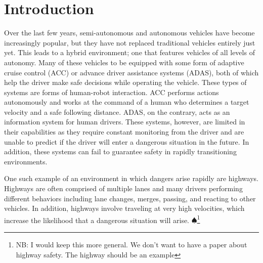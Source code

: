 \documentclass[conference]{IEEEtran}
\newcommand\NB[1]{$\spadesuit$\footnote{NB: #1}}
\begin{document}
\begin{abstract}
\end{abstract}





%
\IEEEpeerreviewmaketitle



\section{Introduction}
    Over the last few years, semi-autonomous and autonomous vehicles have become increasingly popular, but they have not replaced traditional vehicles entirely just yet. This leads to a hybrid environment; one that features vehicles of all levels of autonomy. Many of these vehicles to be equipped with some form of adaptive cruise control (ACC) or advance driver assistance systems (ADAS), both of which help the driver make safe decisions while operating the vehicle. These types of systems are forms of human-robot interaction. ACC performs actions autonomously and works at the command of a human who determines a target velocity and a safe following distance. ADAS, on the contrary, acts as an information system for human drivers. These systems, however, are limited in their capabilities as they require constant monitoring from the driver and are unable to predict if the driver will enter a dangerous situation in the future. In addition, these systems can fail to guarantee safety in rapidly transitioning environments.
    
    One such example of an environment in which dangers arise rapidly are highways. Highways are often comprised of multiple lanes and many drivers performing different behaviors including lane changes, merges, passing, and reacting to other vehicles. In addition, highways involve traveling at very high velocities, which increase the likelihood that a dangerous situation will arise. \NB{I would keep this more general. We don't want to have a paper about highway safety. The highway should be an example}
    
\end{document}
